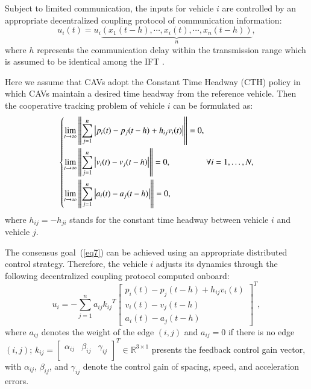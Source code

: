 \documentclass[journal]{IEEEtran}
\begin{document}
Subject to limited communication, the inputs for vehicle $i$ are controlled by an appropriate decentralized coupling protocol of communication information:
\begin{equation}
  {u_i}\left( t \right) = {u_i}\underbrace {\left( {{x_1}\left( {t - h} \right), \cdots ,{x_i}\left( t \right), \cdots ,{x_n}\left( {t - h} \right)} \right)}_n,
  \label{eq6}
\end{equation}
where $h$ represents the communication delay within the transmission range which is assumed to be identical among the IFT \citep{Razzaghpour2022,Sehla2022,Vukadinovic2018a,Vu2020a,Martin-Sacristan2020a}.

Here we assume that CAVs adopt the Constant Time Headway (CTH) policy in which CAVs maintain a desired time headway from the reference vehicle. Then the cooperative tracking problem of vehicle $i$ can be formulated as:
\begin{equation}
  \left\{ \begin{gathered}
    \mathop {\lim }\limits_{t \to \infty } \left\| {\sum\limits_{j = 1}^n {\left| {{p_i}(t) - {p_j}(t - h){\text{ + }}{h_{ij}}{v_i}(t)} \right|} } \right\| = 0, \hfill \\
    \mathop {\lim }\limits_{t \to \infty } \left\| {\sum\limits_{j = 1}^n {\left| {{v_i}(t) - {v_j}(t - h)} \right|} } \right\| = 0, \hfill \\
    \mathop {\lim }\limits_{t \to \infty } \left\| {\sum\limits_{j = 1}^n {\left| {{a_i}(t) - {a_j}(t - h)} \right|} } \right\| = 0, \hfill \\
  \end{gathered}  \right.\forall i = 1, \ldots ,N,
  \label{eq7}
\end{equation}
where ${h_{ij}} =  - {h_{ji}}$ stands for the constant time headway between vehicle $i$ and vehicle $j$.

The consensus goal~(\ref{eq7}) can be achieved using an appropriate distributed control strategy. Therefore, the vehicle $i$ adjusts its dynamics through the following decentralized coupling protocol computed onboard:
\begin{equation}
  {u_i} =  - \sum\limits_{j = 1}^n {{a_{ij}}{k_{ij}}^T{{\left[ {\begin{array}{*{20}{c}}
              {{p_i}\left( t \right) - {p_j}\left( {t - h} \right) + {h_{ij}}{v_i}\left( t \right)}\\ {{v_i}\left( t \right) - {v_j}\left( {t - h} \right)}\\ {{a_i}\left( t \right) - {a_j}\left( {t - h} \right)}
            \end{array}} \right]}^T}},
  \label{eq8}
\end{equation}
where $a_{ij}$ denotes the weight of the edge $\left(i,j\right)$ and $a_{ij}=0$ if there is no edge $\left(i,j\right)$; $k_{ij}=\left[\begin{matrix}\alpha_{ij}&\beta_{ij}&\gamma_{ij}\\\end{matrix}\right]^T\in\mathbb{R}^{3\times1}$ presents the feedback control gain vector, with $\alpha_{ij}$, $\beta_{ij}$, and $\gamma_{ij}$ denote the control gain of spacing, speed, and acceleration errors.
\end{document}
